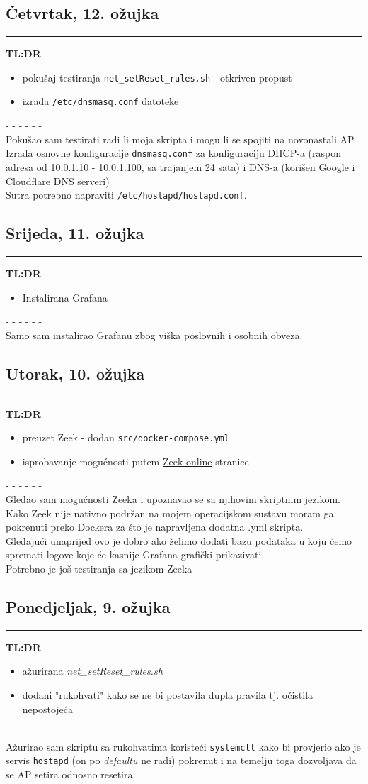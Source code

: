 \documentclass[12pt, a4paper]{article}
\newcommand{\dan}[1]{
    \subsection*{#1}
    \vspace{-0.5em} 
    \hrule \vspace{0.5em} 
}
\begin{document}
\dan{Četvrtak, 12. ožujka}
\textbf{TL:DR}
\begin{itemize}
    \item pokušaj testiranja \lstinline|net_setReset_rules.sh| - otkriven propust
    \item izrada \lstinline|/etc/dnsmasq.conf| datoteke
\end{itemize}
- - - - - - \\
Pokušao sam testirati radi li moja skripta i mogu li se spojiti na novonastali AP.
Izrada osnovne konfiguracije \lstinline|dnsmasq.conf| za konfiguraciju
DHCP-a (raspon adresa od 10.0.1.10 - 10.0.1.100, sa trajanjem 24 sata) i DNS-a (korišen Google i Cloudflare DNS serveri)
\\
Sutra potrebno napraviti \lstinline|/etc/hostapd/hostapd.conf|.

\dan{Srijeda, 11. ožujka}
\textbf{TL:DR}
\begin{itemize}
    \item Instalirana Grafana
\end{itemize}
- - - - - - \\
Samo sam instalirao Grafanu zbog viška poslovnih i osobnih obveza.

\dan{Utorak, 10. ožujka}
\textbf{TL:DR}
\begin{itemize}
    \item preuzet Zeek - dodan \lstinline|src/docker-compose.yml|
    \item isprobavanje mogućnosti putem \href{https://try.zeek.org/}{Zeek online} stranice
\end{itemize}
- - - - - - \\
Gledao sam mogućnosti Zeeka i upoznavao se sa njihovim skriptnim jezikom.
Kako Zeek nije nativno podržan na mojem operacijskom sustavu moram ga pokrenuti preko Dockera 
za što je napravljena dodatna .yml skripta.
\\
Gledajući unaprijed ovo je dobro ako želimo dodati bazu podataka u koju ćemo spremati logove koje će 
kasnije Grafana grafički prikazivati.
\\
Potrebno je još testiranja sa jezikom Zeeka

\dan{Ponedjeljak, 9. ožujka}
\textbf{TL:DR}
\begin{itemize}
    \item ažurirana \textit{net\_setReset\_rules.sh}
    \item dodani "rukohvati" kako se ne bi postavila dupla pravila tj. očistila nepostojeća
\end{itemize}
- - - - - - \\
Ažurirao sam skriptu sa rukohvatima koristeći \lstinline|systemctl| kako bi provjerio ako je servis \lstinline|hostapd| (on po \textit{defaultu} ne radi)
pokrenut i na temelju toga dozvoljava da se AP setira odnosno resetira.
\end{document}
